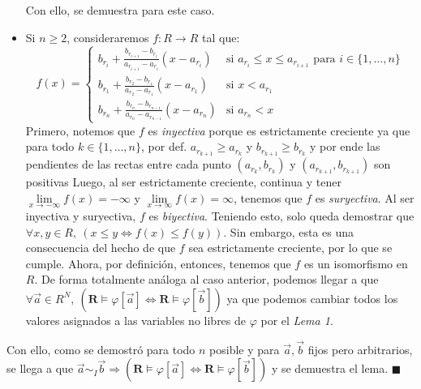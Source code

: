 \documentclass{article}
\begin{document}
\begin{itemize}
        \hspace*{0.5cm} Con ello, se demuestra para este caso.
  \item Si $n\geq 2$, consideraremos $f:R\to R$ tal que:
        \begin{equation*}
          f(x) = \begin{cases}
            b_{r_i}+\frac{b_{r_{i+1}}-b_{r_i}}{a_{r_{i+1}}-a_{r_i}}(x-a_{r_i}) & \text{si }a_{r_i}\leq x\leq a_{r_{i+1}}\text{ para }i\in\{1,\dots,n\} \\
            b_{r_1}+\frac{b_{r_2}-b_{r_1}}{a_{r_2}-a_{r_1}}(x-a_{r_1})         & \text{si }x<a_{r_1}                                                   \\
            b_{r_n}+\frac{b_{r_n}-b_{r_{n-1}}}{a_{r_n}-a_{r_{n-1}}}(x-a_{r_n}) & \text{si }a_{r_n}<x
          \end{cases}
        \end{equation*}
        \hspace*{0.5cm} Primero, notemos que $f$ es \textit{inyectiva} porque es estrictamente creciente ya que para todo $k\in\{1,\dots,n\}$, por def. $a_{r_{k+1}}\geq a_{r_k}$ y $b_{r_{k+1}}\geq b_{r_k}$ y por ende las pendientes de las rectas entre cada punto $(a_{r_k},b_{r_k})$ y $(a_{r_{k+1}},b_{r_{k+1}})$ son positivas \newline
        \hspace*{0.5cm} Luego, al ser estrictamente creciente, continua y tener $\lim\limits_{x\to-\infty}f(x)=-\infty$ y $\lim\limits_{x\to\infty}f(x)=\infty$, tenemos que $f$ es \textit{suryectiva}. \newline
        \hspace*{0.5cm} Al ser inyectiva y suryectiva, $f$ es \textit{biyectiva}. \newline
        \hspace*{0.5cm} Teniendo esto, solo queda demostrar que $\forall x,y\in R,\ (x\leq y\iff f(x)\leq f(y))$. Sin embargo, esta es una consecuencia del hecho de que $f$ sea estrictamente creciente, por lo que se cumple. \newline
        \hspace*{0.5cm} Ahora, por definición, entonces, tenemos que $f$ es un isomorfismo en $R$. De forma totalmente análoga al caso anterior, podemos llegar a que $\forall\vec{a}\in R^N,\ (\mathbf{R}\vDash\varphi[\vec{a}]\iff\mathbf{R}\vDash\varphi[\vec{b}])$ ya que podemos cambiar todos los valores asignados a las variables no libres de $\varphi$ por el \textit{Lema 1}.
\end{itemize}
Con ello, como se demostró para todo $n$ posible y para $\vec{a},\vec{b}$ fijos pero arbitrarios, se llega a que $\vec{a}\sim_I\vec{b}\Rightarrow(\mathbf{R}\vDash\varphi[\vec{a}]\iff\mathbf{R}\vDash\varphi[\vec{b}])$ y se demuestra el lema. $\blacksquare$
\end{document}
